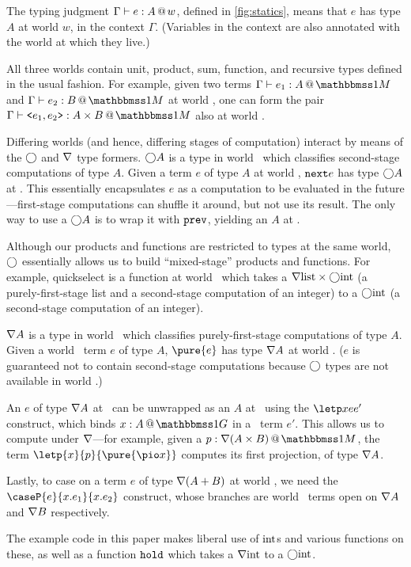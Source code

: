 \begin{abstrsyn}

The typing judgment $\Gamma{} \vdash {e}:{A}~\hspace{-0.15em}\text{@}\hspace{-0.2em}~w$, defined in \ref{fig:statics}, means that
$e$ has type $A$ at world $w$, in the context $\Gamma$. (Variables in the
context are also annotated with the world at which they live.)

All three worlds contain unit, product, sum, function, and recursive types
defined in the usual fashion. For example, given two terms $\typesone{e_1}A$ and
$\typesone{e_2}B$ at world \bbonem, one can form the pair
$\typesone{\texttt{<}e_1,e_2\texttt{>}}{A\times B}$ also at world \bbonem. 

Differing worlds (and hence, differing stages of computation) interact by means
of the $\bigcirc$ and $\nabla$ type formers. $\bigcirc A$ is a type in world \bbonem\
which classifies second-stage computations of type $A$. Given a term $e$ of type
$A$ at world \bbtwo, ${\tt next}{e}$ has type $\bigcirc A$ at \bbonem. This essentially
encapsulates $e$ as a computation to be evaluated in the future---first-stage
computations can shuffle it around, but not use its result.  The only way to use
a $\bigcirc A$ is to wrap it with ${\tt prev}$, yielding an $A$ at \bbtwo.


Although our products and functions are restricted to types at the same world,
$\bigcirc$ essentially allows us to build ``mixed-stage'' products and functions.
For example, quickselect is a function at world \bbonem\ which takes a
$\nabla{\rm list} \times \bigcirc{\rm int}$ (a purely-first-stage list and a
second-stage computation of an integer) to a $\bigcirc{\rm int}$ (a second-stage
computation of an integer).

$\nabla A$ is a type in world \bbonem\ which classifies purely-first-stage
computations of type $A$. Given a world \bbonep\ term $e$ of type $A$,
$\pure{e}$ has type $\nabla A$ at world \bbonem. ($e$ is guaranteed not to contain
second-stage computations because $\bigcirc$ types are not available in world
\bbonep.)

An $e$ of type $\nabla A$ at \bbonem\ can be unwrapped as an $A$ at \bbonep\
using the $\letp xe{e'}$ construct, which binds $\colpure xA$ in a \bbonem\ term
$e'$. This allows us to compute under $\nabla$---for example, given a $\colmix
p{\curr(A\times B)}$, the term $\letp{x}{p}{\pure{\pio x}}$ computes its first
projection, of type $\nabla A$.

Lastly, to case on a term $e$ of type $\nabla(A+B)$ at world \bbonem, we need the
$\caseP{e}{x.e_1}{x.e_2}$ construct, whose branches are world \bbonem\ terms
open on $\nabla{A}$ and $\nabla{B}$ respectively.

The example code in this paper makes liberal use of ${\rm int}$s and various
functions on these, as well as a function ${\tt hold}$ which takes a $\nabla{\rm int}$
to a $\bigcirc{\rm int}$.

\end{abstrsyn}

